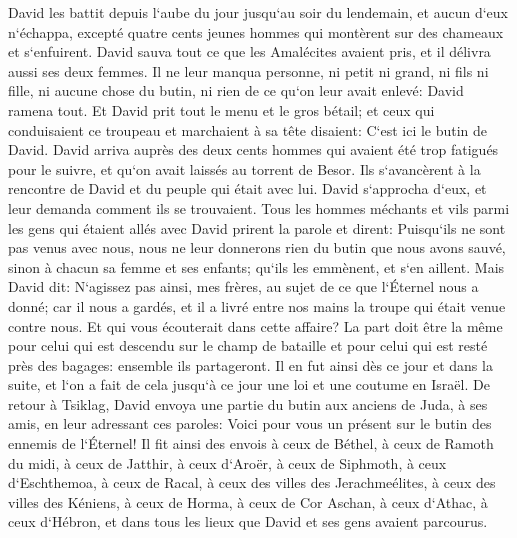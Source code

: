 \verse David les battit depuis l`aube du jour jusqu`au soir du lendemain, et aucun d`eux n`échappa, excepté quatre cents jeunes hommes qui montèrent sur des chameaux et s`enfuirent. 
\verse David sauva tout ce que les Amalécites avaient pris, et il délivra aussi ses deux femmes. 
\verse Il ne leur manqua personne, ni petit ni grand, ni fils ni fille, ni aucune chose du butin, ni rien de ce qu`on leur avait enlevé: David ramena tout. 
\verse Et David prit tout le menu et le gros bétail; et ceux qui conduisaient ce troupeau et marchaient à sa tête disaient: C`est ici le butin de David. 
\verse David arriva auprès des deux cents hommes qui avaient été trop fatigués pour le suivre, et qu`on avait laissés au torrent de Besor. Ils s`avancèrent à la rencontre de David et du peuple qui était avec lui. David s`approcha d`eux, et leur demanda comment ils se trouvaient. 
\verse Tous les hommes méchants et vils parmi les gens qui étaient allés avec David prirent la parole et dirent: Puisqu`ils ne sont pas venus avec nous, nous ne leur donnerons rien du butin que nous avons sauvé, sinon à chacun sa femme et ses enfants; qu`ils les emmènent, et s`en aillent. 
\verse Mais David dit: N`agissez pas ainsi, mes frères, au sujet de ce que l`Éternel nous a donné; car il nous a gardés, et il a livré entre nos mains la troupe qui était venue contre nous. 
\verse Et qui vous écouterait dans cette affaire? La part doit être la même pour celui qui est descendu sur le champ de bataille et pour celui qui est resté près des bagages: ensemble ils partageront. 
\verse Il en fut ainsi dès ce jour et dans la suite, et l`on a fait de cela jusqu`à ce jour une loi et une coutume en Israël. 
\verse De retour à Tsiklag, David envoya une partie du butin aux anciens de Juda, à ses amis, en leur adressant ces paroles: Voici pour vous un présent sur le butin des ennemis de l`Éternel! 
\verse Il fit ainsi des envois à ceux de Béthel, à ceux de Ramoth du midi, à ceux de Jatthir, 
\verse à ceux d`Aroër, à ceux de Siphmoth, à ceux d`Eschthemoa, 
\verse à ceux de Racal, à ceux des villes des Jerachmeélites, à ceux des villes des Kéniens, 
\verse à ceux de Horma, à ceux de Cor Aschan, à ceux d`Athac, 
\verse à ceux d`Hébron, et dans tous les lieux que David et ses gens avaient parcourus. 

\chapter{}

